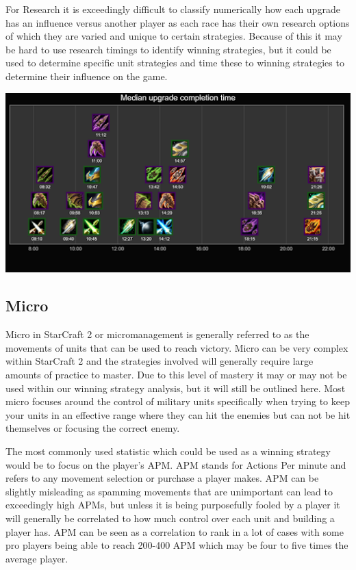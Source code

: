 \documentclass[a4paper,12pt]{report}
\begin{document}
For Research it is exceedingly difficult to classify numerically how each upgrade has an influence versus another player as each race has their own research options of which they are varied and unique to certain strategies. Because of this it may be hard to use research timings to identify winning strategies, but it could be used to determine specific unit strategies and time these to winning strategies to determine their influence on the game.

\begin{center}
    \captionsetup{type=figure}
    \includegraphics[width=.6\linewidth]{media/medianupgrades.png}
\end{center}

\subsection{Micro}

Micro in StarCraft 2 or micromanagement is generally referred to as the movements of units that can be used to reach victory.  Micro can be very complex within StarCraft 2 and the strategies involved will generally require large amounts of practice to master. Due to this level of mastery it may or may not be used within our winning strategy analysis, but it will still be outlined here. Most micro focuses around the control of military units specifically when trying to keep your units in an effective range where they can hit the enemies but can not be hit themselves or focusing the correct enemy.

The most commonly used statistic which could be used as a winning strategy would be to focus on the player’s APM. APM stands for Actions Per minute and refers to any movement selection or purchase a player makes. APM can be slightly misleading as spamming movements that are unimportant can lead to exceedingly high APMs, but unless it is being purposefully fooled by a player it will generally be correlated to how much control over each unit and building a player has. APM can be seen as a correlation to rank in a lot of cases with some pro players being able to reach 200-400 APM which may be four to five times the average player.
\end{document}
